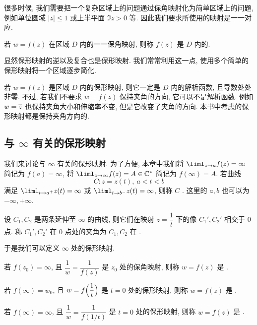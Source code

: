 很多时候, 我们需要把一个复杂区域上的问题通过保角映射化为简单区域上的问题, 例如单位圆域 $|z|\le1$ 或上半平面 $\Im z>0$ 等.
因此我们要求所使用的映射是一一对应.

\begin{definition}
  若 $w=f(z)$ 在区域 $D$ 内的一一保角映射, 则称 $f(z)$ 是 $D$ 内的.\footnotemark
\end{definition}

显然保形映射的逆以及复合也是保形映射.
我们常常利用这一点, 使用多个简单的保形映射将一个区域逐步简化.

若 $w=f(z)$ 是区域 $D$ 内的保形映射, 则它一定是 $D$ 内的解析函数, 且导数处处非零.
不过, 若我们不要求 $w=f(z)$ 保持夹角的方向, 它可以不是解析函数.
例如 $w=\overline z$ 也保持夹角大小和伸缩率不变, 但是它改变了夹角的方向.
\alert{本书中考虑的保形映射都是保持夹角方向的}.


\subsection{与 \texorpdfstring{$\infty$}{∞} 有关的保形映射}

我们来讨论与 $\infty$ 有关的保形映射.
为了方便, 本章中我们将 $\liml_{z\ra a}f(z)=\infty$ 简记为 $f(a)=\infty$, 将 $\liml_{z\ra \infty}f(z)=A\in\BC^*$ 简记为 $f(\infty)=A$.
若曲线
\[
  C: z=z(t),\ a<t<b
\]
满足 $\liml_{t\ra a^+}z(t)=\infty$ 或 $\liml_{t\ra b^-}z(t)=\infty$, 则称 $C$ .
这里的 $a,b$ 也可以为 $-\infty,+\infty$.

\begin{definition}
  设 $C_1,C_2$ 是两条延伸至 $\infty$ 的曲线, 则它们在映射 $z=\dfrac1t$ 下的像 $C_1',C_2'$ 相交于 $0$ 点.
  称 $C_1',C_2'$ 在 $0$ 点处的夹角为 $C_1,C_2$ 在 .
\end{definition}

于是我们可以定义 $\infty$ 处的保形映射.
\begin{definition}
  \begin{enumpar}
    \item 若 $f(z_0)=\infty$, 且 $\dfrac1w=\dfrac1{f(z)}$ 是 $z_0$ 处的保角映射, 则称 $w=f(z)$ 是 .
    \item 若 $f(\infty)=w_0$, 且 $w=f\Bigl(\dfrac1t\Bigr)$ 是 $t=0$ 处的保形映射, 则称 $w=f(z)$ 是 .
    \item 若 $f(\infty)=\infty$, 且 $\dfrac1w=\dfrac1{f(1/t)}$ 是 $t=0$ 处的保形映射, 则称 $w=f(z)$ 是 .
  \end{enumpar}
\end{definition}

